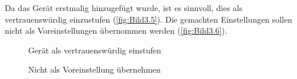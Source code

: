 Da das Gerät erstmalig hinzugefügt wurde, ist es sinnvoll, dies als vertrauenswürdig einzustufen (\autoref{fig:Bild3.5}). Die gemachten Einstellungen sollen nicht als Voreinstellungen übernommen werden (\autoref{fig:Bild3.6}).  
\begin{figure}[H]
   \centering
   \caption[Gerät als vertrauenswürdig einstufen]{Gerät als vertrauenswürdig einstufen}
   \label{fig:Bild3.5}
\end{figure}

\begin{figure}[H]
   \centering
   \caption[Nicht als Vorteinstellung übernehmen]{Nicht als Voreinstellung übernehmen}
   \label{fig:Bild3.6}
\end{figure}

\clearpage

